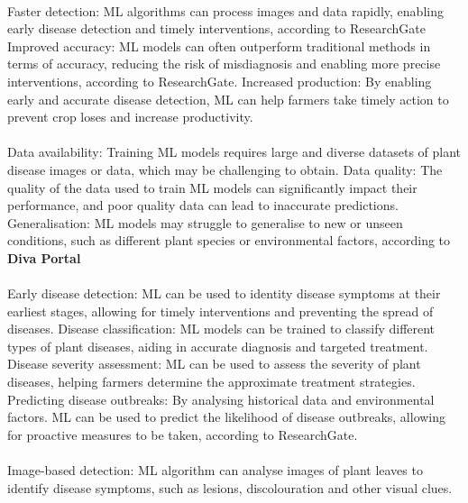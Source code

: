 \paragraph*{} Faster detection: ML algorithms can process images and data rapidly, enabling early disease detection and timely interventions, according to ResearchGate Improved accuracy: ML models can often outperform traditional methods in terms of accuracy, reducing the risk of misdiagnosis and enabling more precise interventions, according to ResearchGate. Increased production: By enabling early and accurate disease detection, ML can help farmers take timely action to prevent crop loses and increase productivity. 

\paragraph*{} Data availability: Training ML models requires large and diverse datasets of plant disease images or data, which may be challenging to obtain. Data quality: The quality of the data used to train ML models can significantly impact their performance, and poor quality data can lead to inaccurate predictions. Generalisation: ML models may struggle to generalise to new or unseen conditions, such as different plant species or environmental factors, according to {\bfseries Diva Portal}

\paragraph*{} 
Early disease detection: ML can be used to identity disease symptoms at their earliest stages, allowing for timely interventions and preventing the spread of diseases. Disease classification: ML models can be trained to classify different types of plant diseases, aiding in accurate diagnosis and targeted treatment. Disease severity assessment: ML can be used to assess the severity of plant diseases, helping farmers determine the approximate treatment strategies. Predicting disease outbreaks: By analysing historical data and environmental factors. ML can be used to predict the likelihood of disease outbreaks, allowing for proactive measures to be taken, according to ResearchGate.

\paragraph*{} Image-based detection: ML algorithm can analyse images of plant leaves to identify disease symptoms, such as lesions, discolouration and other visual clues.

